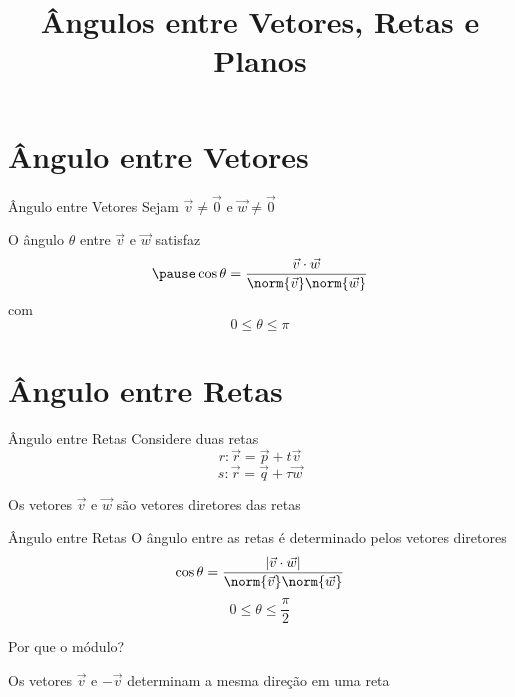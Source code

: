 \documentclass[fleqn,aspectratio=169,12pt]{beamer}
\title{Ângulos entre Vetores, Retas e Planos}
\begin{document}
\addtitle

\section{Ângulo entre Vetores}


\begin{frame}{Ângulo entre Vetores}
  Sejam \(\vec{v}\neq\vec{0}\) e \(\vec{w}\neq\vec{0}\)

  \pause
  \bigskip
  O ângulo $\theta$ entre $\vec{v}$ e $\vec{w}$ satisfaz
  \[
    \pause
    \cos\theta = \frac{\vec{v}\cdot\vec{w}}{\norm{\vec{v}}\norm{\vec{w}}}
  \]
  \pause
  com
  \[
    0 \leq \theta \leq \pi
  \]
\end{frame}



\section{Ângulo entre Retas}


\begin{frame}{Ângulo entre Retas}
  Considere duas retas
  \[
    r\colon \vec{r} = \vec{p} + t\vec{v}
  \]
  \[
    s\colon \vec{r} = \vec{q} + \tau\vec{w}
  \]

  \pause
  Os vetores
  \(
    \vec{v}
  \) e
  \(
    \vec{w}
  \)
  são vetores diretores das retas
\end{frame}

\begin{frame}{Ângulo entre Retas}
  O ângulo entre as retas é determinado pelos vetores diretores
  \pause
  \[
    \cos\theta = \frac{\left|\vec{v}\cdot\vec{w}\right|}{\norm{\vec{v}}\norm{\vec{w}}}
  \]
  \pause
  \[
    0\leq\theta\leq\frac{\pi}{2}
  \]

  \pause
  Por que o módulo?

  \pause
  Os vetores \(\vec{v}\) e \(-\vec{v}\)
  determinam a mesma direção em uma reta
\end{frame}
\end{document}
